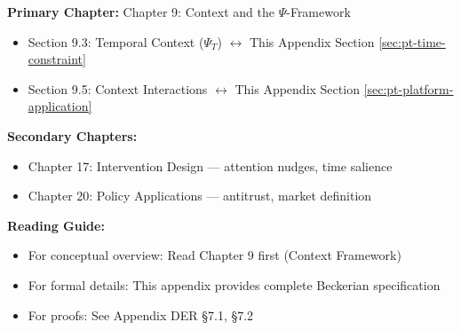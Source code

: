 
\begin{tcolorbox}[colback=purple!5!white, colframe=purple!75!black,
    title=Chapter Linkage]

\textbf{Primary Chapter:} Chapter 9: Context and the $\Psi$-Framework
\begin{itemize}[nosep]
\item Section 9.3: Temporal Context ($\Psi_T$) $\leftrightarrow$ This Appendix Section \ref{sec:pt-time-constraint}
\item Section 9.5: Context Interactions $\leftrightarrow$ This Appendix Section \ref{sec:pt-platform-application}
\end{itemize}

\textbf{Secondary Chapters:}
\begin{itemize}[nosep]
\item Chapter 17: Intervention Design --- attention nudges, time salience
\item Chapter 20: Policy Applications --- antitrust, market definition
\end{itemize}

\textbf{Reading Guide:}
\begin{itemize}[nosep]
\item For conceptual overview: Read Chapter 9 first (Context Framework)
\item For formal details: This appendix provides complete Beckerian specification
\item For proofs: See Appendix DER §7.1, §7.2
\end{itemize}

\end{tcolorbox}


\begin{abstract}
This appendix integrates Becker's (1965) Time Allocation Theory into the EBF framework,
with particular application to digital platform economics. We formalize how time constraints
affect consumer demand when monetary prices approach zero, deriving predictions for
substitution patterns (diversion ratios) based on time cost shares. The framework explains
why Facebook and Instagram are close substitutes despite being ``free''---their similar
time shares predict high diversion ratios. Policy implications include revised antitrust
market definitions and attention-based intervention design.

\textit{Theory Catalog Reference: CAT-17 (MS-TA-001, MS-TA-002, MS-TA-003)}
\end{abstract}

